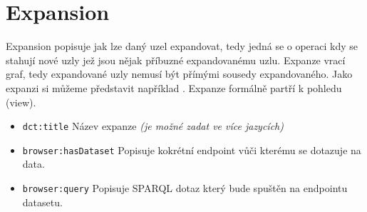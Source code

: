 \section{Expansion}
Expansion popisuje jak lze daný uzel expandovat, tedy jedná se o operaci kdy se stahují nové uzly jež jsou nějak příbuzné expandovanému uzlu. Expanze vrací graf, tedy expandované uzly nemusí být přímými sousedy expandovaného. Jako expanzi si můžeme představit například . Expanze formálně partří k pohledu (view).
\begin{itemize}
    \item \texttt{dct:title} Název expanze \textit{(je možné zadat ve více jazycích)}
    \item \texttt{browser:hasDataset} Popisuje kokrétní endpoint vůči kterému se dotazuje na data.
    \item \texttt{browser:query} Popisuje SPARQL dotaz který bude spuštěn na endpointu datasetu.
\end{itemize}